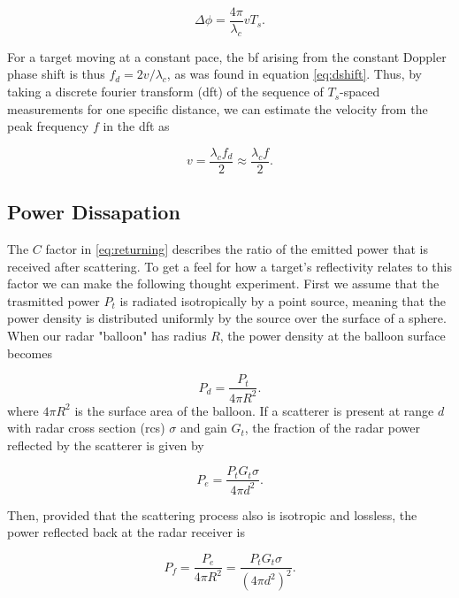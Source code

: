 \begin{equation}
	\Delta \phi = \frac{4\pi}{\lambda_c}vT_s.
\end{equation}

For a target moving at a constant pace, the \gls{bf} arising from the constant Doppler phase shift is thus $f_d = 2v/\lambda_c$, as was found in equation \eqref{eq:dshift}. Thus, by taking a discrete fourier transform (\gls{dft}) of the sequence of $T_s$-spaced measurements for one specific distance, we can estimate the velocity from the peak frequency $f$ in the \gls{dft} as 

\begin{equation}\label{eq:dopp}
	v = \frac{\lambda_c f_d}{2}
	\approx \frac{\lambda_c f}{2}.
\end{equation}


\subsection{Power Dissapation}

The $C$ factor in \eqref{eq:returning} describes the ratio of the emitted power that is received after scattering. To get a feel for how a target's reflectivity relates to this factor we can make the following thought experiment. First we assume that the trasmitted power $P_t$ is radiated isotropically by a point source, meaning that the power density is distributed uniformly by the source over the surface of a sphere. When our radar "balloon" has radius $R$, the power density at the balloon surface becomes  \citep{amin_2017}

\begin{equation}
	P_d 
	= \frac{P_t}{4\pi R^2}.
\end{equation}
where $4\pi R^2$ is the surface area of the balloon. If a scatterer is present at range $d$ with radar cross section (\gls{rcs}) $\sigma$ and gain $G_t$, the fraction of the radar power reflected by the scatterer is given by 

\begin{equation}
	P_{e}
	= \frac{P_tG_t\sigma}{4\pi d^2}.
\end{equation}

Then, provided that the scattering process also is isotropic and lossless, the power reflected back at the radar receiver is

\begin{equation}\label{eq:temp}
	P_f 
	= \frac{P_e}{4\pi R^2} 
	= \frac{P_t G_t \sigma}{(4\pi d^2)^2}.
\end{equation}

